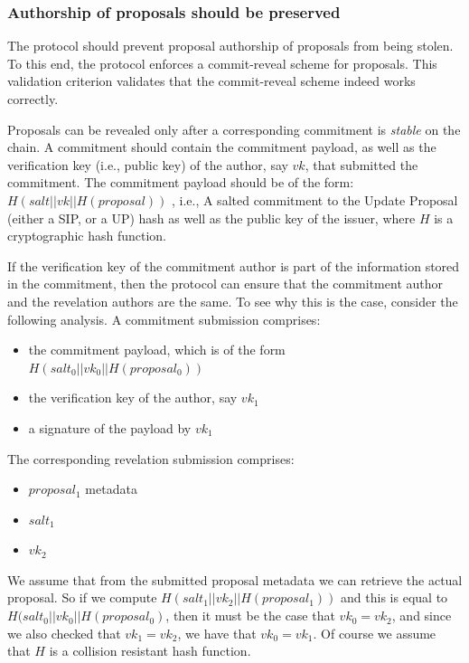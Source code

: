 \subsubsection{Authorship of proposals should be
	preserved}\label{vc:proposals_authorship}

The protocol should prevent proposal authorship of proposals from being stolen.
To this end, the protocol enforces a commit-reveal scheme for proposals.
This validation criterion validates that the commit-reveal scheme indeed works
correctly.

Proposals can be revealed only after a corresponding commitment is 
\emph{stable} on
the chain. A commitment should contain the commitment payload, as well as the
verification
key (i.e., public key) of the author, say $vk$, that submitted 
the commitment. The commitment payload
should be of the form:
\begin{math}
	H (salt || vk || H (proposal))
\end{math}
, i.e., A salted commitment to the Update Proposal (either a SIP, or a UP) hash
as well as the public key of the issuer, where $H$ is a cryptographic hash
function.

If the verification key of the commitment author is part of the information 
stored
in the commitment, then the protocol can ensure that the commitment author and 
the
revelation authors are the same. To see why this is the case, consider the
following analysis. A commitment submission comprises:
\begin{itemize}
	\item the commitment payload, which is of the form $H (salt_0 || vk_0 || H
	(proposal_0))$
	\item the verification key of the author, say $vk_1$
	\item a signature of the payload by $vk_1$
\end{itemize}

The corresponding revelation submission comprises:
\begin{itemize}
	\item $proposal_1$ metadata %
	\item $salt_1$
	\item $vk_2$
\end{itemize}

We assume that from the submitted proposal metadata we can retrieve the actual 
proposal. So if we compute $H(salt_1 || vk_2 || H (proposal_1))$ and this is 
equal to
$H(salt_0 || vk_0 || H (proposal_0)$, then it must be the case that $vk_0 =
vk_2$, and since we also checked that $vk_1 = vk_2$, we have that $vk_0 =
vk_1$. Of course we assume that $H$ is a collision resistant hash function.

